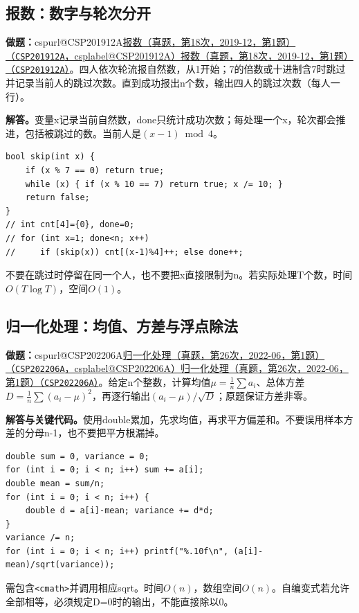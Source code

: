\documentclass[UTF8,11pt,a4paper,fontset=none]{ctexart}
\makeatletter
\newcommand{\csp}[2]{\ifcsname cspurl@#1\endcsname\href{\csname cspurl@#1\endcsname}{#2（\texttt{#1}，\csname csplabel@#1\endcsname）}\else\href{https://oj.shumeng.tech/p/#1}{#2（\texttt{#1}）}\fi}
\makeatother
\begin{document}
\subsection{报数：数字与轮次分开}

\noindent\textbf{做题：}\csp{CSP201912A}{报数（真题，第18次，2019-12，第1题）}。四人依次轮流报自然数，从1开始；7的倍数或十进制含7时跳过并记录当前人的跳过次数。直到成功报出n个数，输出四人的跳过次数（每人一行）。

\noindent\textbf{解答。}变量x记录当前自然数，done只统计成功次数；每处理一个x，轮次都会推进，包括被跳过的数。当前人是$(x-1)\bmod4$。
\par\noindent\begin{minipage}{\linewidth}
\begin{lstlisting}
bool skip(int x) {
    if (x % 7 == 0) return true;
    while (x) { if (x % 10 == 7) return true; x /= 10; }
    return false;
}
// int cnt[4]={0}, done=0;
// for (int x=1; done<n; x++)
//     if (skip(x)) cnt[(x-1)%4]++; else done++;
\end{lstlisting}
\end{minipage}\par
不要在跳过时停留在同一个人，也不要把x直接限制为n。若实际处理T个数，时间$O(T\log T)$，空间$O(1)$。
\subsection{归一化处理：均值、方差与浮点除法}

\noindent\textbf{做题：}\csp{CSP202206A}{归一化处理（真题，第26次，2022-06，第1题）}。给定n个整数，计算均值$\mu=\frac1n\sum a_i$、总体方差$D=\frac1n\sum(a_i-\mu)^2$，再逐行输出$(a_i-\mu)/\sqrt D$；原题保证方差非零。

\noindent\textbf{解答与关键代码。}使用double累加，先求均值，再求平方偏差和。不要误用样本方差的分母n-1，也不要把平方根漏掉。
\par\noindent\begin{minipage}{\linewidth}
\begin{lstlisting}
double sum = 0, variance = 0;
for (int i = 0; i < n; i++) sum += a[i];
double mean = sum/n;
for (int i = 0; i < n; i++) {
    double d = a[i]-mean; variance += d*d;
}
variance /= n;
for (int i = 0; i < n; i++) printf("%.10f\n", (a[i]-mean)/sqrt(variance));
\end{lstlisting}
\end{minipage}\par
需包含\texttt{<cmath>}并调用相应sqrt。时间$O(n)$，数组空间$O(n)$。自编变式若允许全部相等，必须规定D=0时的输出，不能直接除以0。
\end{document}
